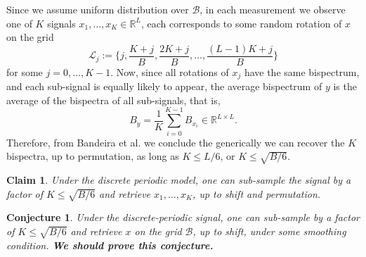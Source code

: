 \documentclass[english,12pt]{article}
\newtheorem{claim}{Claim}
\newtheorem{conj}{Conjecture}
\newcommand{\R}{\mathbb{R}}
\begin{document}
Since we assume uniform distribution over $\mathcal{B}$, in each measurement we observe one of $K$ signals $x_1,\ldots,x_K\in\R^L$, each corresponds to some random rotation of $x$ on the grid  $$\mathcal{L}_j:=\{j,\frac{K+j}{B},\frac{2K+j}{B},\ldots,\frac{(L-1)K+j}{B}\}$$ for some $j=0,\ldots,K-1$.
Now, since all rotations of $x_j$ have the same bispectrum, and each sub-signal is equally likely to appear, the  
average bispectrum of $y$ is the average of the bispectra of all sub-signals, that is,$$B_y = \frac{1}{K}\sum_{i=0}^{K-1}B_{x_i}\in\R^{L\times L}.$$ 
 Therefore, from Bandeira et al. we conclude the generically we can recover the $K$ bispectra, up to permutation, as long as $K\leq L/6$, or $K\leq \sqrt{B/6}$.

\begin{claim} \label{claim1}
Under the discrete periodic model, one can sub-sample the signal by a factor of  	$K\leq \sqrt{B/6}$ and retrieve $x_1,\ldots,x_K$, up to shift and permutation. 
\end{claim}	

\begin{conj} \label{conj1}
	Under the discrete-periodic signal, one can sub-sample by a factor of  	$K\leq \sqrt{B/6}$ and retrieve  $x$ on the grid $\mathcal{B}$, up to shift, under some smoothing condition. \textbf{We should prove this conjecture.}
\end{conj}	
\end{document}

